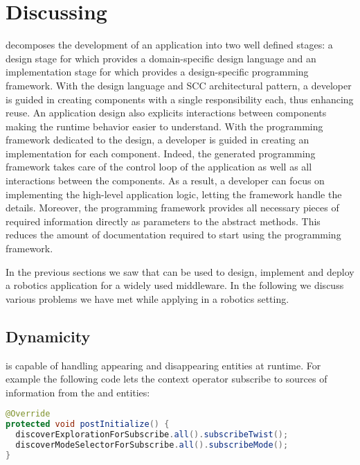 
\section{Discussing}
\label{sec:discussing}

\diaspec{} decomposes the development of an application into two well
defined stages: a design stage for which \diaspec{} provides a
domain-specific design language and an implementation stage for which
\diaspec{} provides a design-specific programming framework. With the
design language and SCC architectural pattern, a developer is guided
in creating components with a single responsibility each, thus
enhancing reuse. An application design also explicits interactions
between components making the runtime behavior easier to understand.
With the programming framework dedicated to the design, a developer is
guided in creating an implementation for each component.
Indeed, the generated programming framework takes care of the control
loop of the application as well as all interactions between the
components. As a result, a developer can focus on implementing the
high-level application logic, letting the framework handle the
details. Moreover, the programming framework provides all necessary
pieces of required information directly as parameters to the abstract
methods. This reduces the amount of documentation required to start
using the programming framework.

In the previous sections we saw that \diaspec{} can be used to design,
implement and deploy a robotics application for a widely used
middleware. In the following we discuss various problems we have met
while applying \diaspec{} in a robotics setting.

\subsection{\diaspec{} Dynamicity}

\diaspec{} is capable of handling appearing and disappearing entities
at runtime. For example the following code lets the 
context operator subscribe to sources of information from the
 and  entities:

\begin{lstlisting}[language=java,numbers=none]
@Override
protected void postInitialize() {
  discoverExplorationForSubscribe.all().subscribeTwist();
  discoverModeSelectorForSubscribe.all().subscribeMode();
}
\end{lstlisting}

